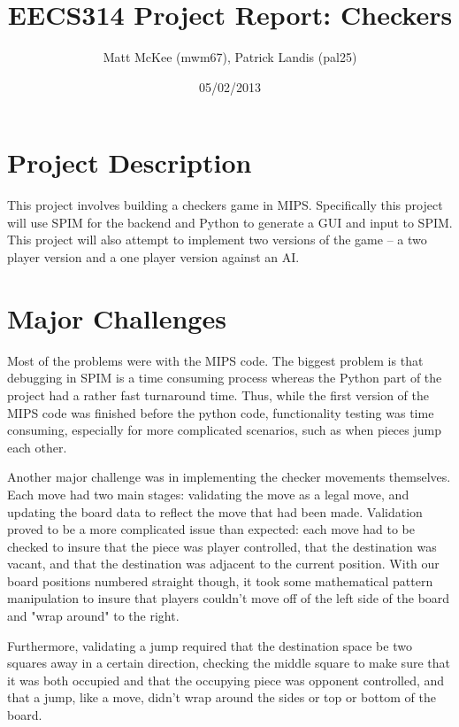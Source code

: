 \documentclass[]{article}
\title{EECS314 Project Report: Checkers}
\author{Matt McKee (mwm67), Patrick Landis (pal25)}
\date{05/02/2013}
\begin{document}
\maketitle

\section*{Project Description}
This project involves building a checkers game in MIPS. Specifically this project will use SPIM for the backend and Python to generate a GUI and input to SPIM. This project will also attempt to implement two versions of the game -- a two player version and a one player version against an AI.

\section*{Major Challenges}
Most of the problems were with the MIPS code. The biggest problem is that debugging in SPIM is a time consuming process whereas the Python part of the project had a rather fast turnaround time. Thus, while the first version of the MIPS code was finished before the python code, functionality testing was time consuming, especially for more complicated scenarios, such as when pieces jump each other.

Another major challenge was in implementing the checker movements themselves. Each move had two main stages: validating the move as a legal move, and updating the board data to reflect the move that had been made. Validation proved to be a more complicated issue than expected: each move had to be checked to insure that the piece was player controlled, that the destination was vacant, and that the destination was adjacent to the current position. With our board positions numbered straight though, it took some mathematical pattern manipulation to insure that players couldn't move off of the left side of the board and "wrap around" to the right.

Furthermore, validating a jump required that the destination space be two squares away in a certain direction, checking the middle square to make sure that it was both occupied and that the occupying piece was opponent controlled, and that a jump, like a move, didn't wrap around the sides or top or bottom of the board.
\end{document}
